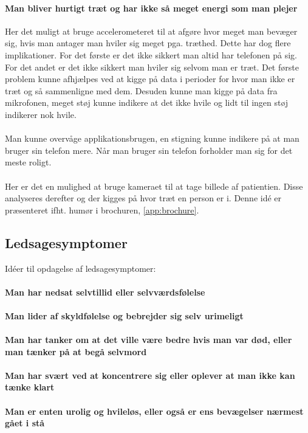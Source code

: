 \paragraph{Man bliver hurtigt træt og har ikke så meget energi som man plejer}
Her det muligt at bruge accelerometeret til at afgøre hvor meget man bevæger sig, hvis man antager man hviler sig meget pga. træthed. Dette har dog flere implikationer. For det første er det ikke sikkert man altid har telefonen på sig. For det andet er det ikke sikkert man hviler sig selvom man er træt.
Det første problem kunne afhjælpes ved at kigge på data i perioder for hvor man ikke er træt og så sammenligne med dem.
Desuden kunne man kigge på data fra mikrofonen, meget støj kunne indikere at det ikke hvile og lidt til ingen støj indikerer nok hvile.
\\
\\
Man kunne overvåge applikationsbrugen, en stigning kunne indikere på at man bruger sin telefon mere. Når man bruger sin telefon forholder man sig for det meste roligt.
\\
\\
Her er det en mulighed at bruge kameraet til at tage billede af patientien. Disse analyseres derefter og der kigges på hvor træt en person er i. Denne idé er præsenteret ifht. humør i brochuren, \cref{app:brochure}.

\subsection{Ledsagesymptomer}
Idéer til opdagelse af ledsagesymptomer:
\paragraph{Man har nedsat selvtillid eller selvværdsfølelse}
\paragraph{Man lider af skyldfølelse og bebrejder sig selv urimeligt}
\paragraph{Man har tanker om at det ville være bedre hvis man var død, eller man tænker på at begå selvmord}
\paragraph{Man har svært ved at koncentrere sig eller oplever at man ikke kan tænke klart}
\paragraph{Man er enten urolig og hvileløs, eller også er ens bevægelser nærmest gået i stå}

